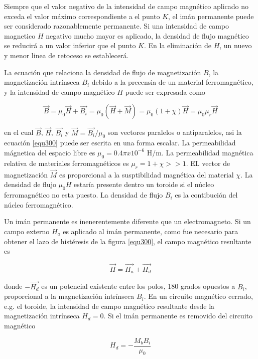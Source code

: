 \documentclass[12pt]{book}
\theoremstyle{definition}
\theoremstyle{remark}
\theoremstyle{plain}
\begin{document}
Siempre que el valor negativo de la intensidad de campo magnético aplicado no exceda el valor máximo correspondiente a el punto $K$, el imán permanente puede ser considerado razonablemente permanente. Si una intensidad de campo magnetico $H$  negativo mucho mayor es aplicado, la densidad de flujo magnético se reducirá a un valor inferior que el punto $K$. En la eliminación de $H$, un nuevo y menor linea de retoceso se establecerá.

La ecuación que relaciona la densidad de flujo de magnetización $B$, la magnetización intrínseca $B_i$ debido a la precensia de un material ferromagnético, y la intensidad de campo magnético $H$ puede ser expresada como

\begin{equation}
\label{equ300}
\vec{B} = \mu _0 \vec{H} + \vec{B_i} = \mu _0 (\vec{H}+\vec{M}) = \mu _0 (1+ \chi) \vec{H} = \mu _0 \mu _r \vec{H}
\end{equation}

en el cual $\vec{B}$, $\vec{H}$, $\vec{B_i}$ y $\vec{M}=\vec{B_i}/\mu _0$ son vectores paralelos o antiparalelos, asi la ecuación \ref{equ300} puede ser escrita en una forma escalar. La permeabilidad mágnetica del espacio libre es $\mu_0 = 0.4 \pi x 10^{-6}$ H/m. La permeabilidad magnética relativa de materiales ferromagnéticos es $\mu_r = 1+ \chi >>1$. EL vector de magnetización $\vec{M}$ es proporcional a la susptibilidad magnética del material $\chi$. La densidad de flujo $\mu_0 H$  estaría presente dentro un toroide si el núcleo ferromagnético no esta puesto. La densidad de flujo $B_i$ es la contibución del núcleo ferromagnético.

Un imán permanente es inenerentemente diferente que un electromagneto. Si un campo externo $H_a$ es aplicado al imán permanente, como fue necesario para obtener el lazo de histéresis de la figura \ref{equ300}, el campo magnético resultante es

\begin{equation}
\label{equ301}
\vec{H} = \vec{H_a}+ \vec{H_d}
\end{equation}

donde $-\vec{H_d}$ es un potencial existente entre los polos, 180 grados  opuestos a $B_i$, proporcional a la magnetización intrínseca $B_i$. En un circuito magnético cerrado, e.g. el toroide, la intensidad de campo magnético resultante desde la magnetización intrínseca $H_d=0$. Si el imán permanente es removido del circuito magnético

\begin{equation}
\label{equ302}
H_d = - \frac{M_b B_i}{\mu _0}
\end{equation}
\end{document}
